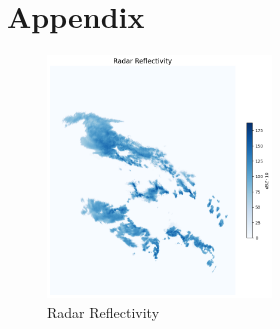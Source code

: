 \documentclass[acmtog, authorversion]{acmart}
\begin{document}




\newpage
\appendix
\section{Appendix}

\begin{figure}
    \centering
    \includegraphics[width=225]{report/images/radar_reflectivity.png}
    \caption{Radar Reflectivity}
    \label{fig:reflect}
\end{figure}
\end{document}
